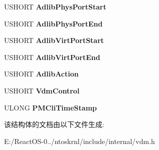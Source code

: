 \begin{DoxyCompactItemize}
\item 
\mbox{\label{struct___v_d_m___p_r_o_c_e_s_s___o_b_j_e_c_t_s_a9b9a0a6c94403ff3b4f07f4a60a8344a}} 
U\+S\+H\+O\+RT {\bfseries Adlib\+Phys\+Port\+Start}
\item 
\mbox{\label{struct___v_d_m___p_r_o_c_e_s_s___o_b_j_e_c_t_s_ab411801b520f3415f892e8b74389dcde}} 
U\+S\+H\+O\+RT {\bfseries Adlib\+Phys\+Port\+End}
\item 
\mbox{\label{struct___v_d_m___p_r_o_c_e_s_s___o_b_j_e_c_t_s_a5ae0a1bc0f627106db462b1e05340989}} 
U\+S\+H\+O\+RT {\bfseries Adlib\+Virt\+Port\+Start}
\item 
\mbox{\label{struct___v_d_m___p_r_o_c_e_s_s___o_b_j_e_c_t_s_a1c409a19b2a0981b0572691f16140964}} 
U\+S\+H\+O\+RT {\bfseries Adlib\+Virt\+Port\+End}
\item 
\mbox{\label{struct___v_d_m___p_r_o_c_e_s_s___o_b_j_e_c_t_s_ab14716a827435869f684ad8460a1b661}} 
U\+S\+H\+O\+RT {\bfseries Adlib\+Action}
\item 
\mbox{\label{struct___v_d_m___p_r_o_c_e_s_s___o_b_j_e_c_t_s_ad3d7d46c5336587977939502bfd067cb}} 
U\+S\+H\+O\+RT {\bfseries Vdm\+Control}
\item 
\mbox{\label{struct___v_d_m___p_r_o_c_e_s_s___o_b_j_e_c_t_s_ab94bfcb1171e224d883cf642cd37770a}} 
U\+L\+O\+NG {\bfseries P\+M\+Cli\+Time\+Stamp}
\end{DoxyCompactItemize}


该结构体的文档由以下文件生成\+:\begin{DoxyCompactItemize}
\item 
E\+:/\+React\+O\+S-\/0../ntoskrnl/include/internal/vdm.\+h\end{DoxyCompactItemize}
